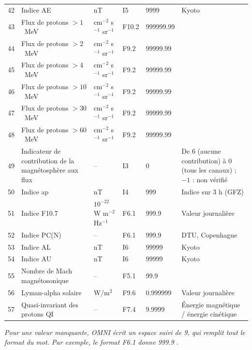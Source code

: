 \begin{longtable}{r p{5.0cm} p{2.0cm} l l p{3.3cm}}
42 & Indice AE & nT & I5 & 9999 & Kyoto \\
43 & Flux de protons $>1$~MeV & cm$^{-2}$ s$^{-1}$ sr$^{-1}$ & F10.2 & 999999.99 & \\
44 & Flux de protons $>2$~MeV & cm$^{-2}$ s$^{-1}$ sr$^{-1}$ & F9.2 & 99999.99 & \\
45 & Flux de protons $>4$~MeV & cm$^{-2}$ s$^{-1}$ sr$^{-1}$ & F9.2 & 99999.99 & \\
46 & Flux de protons $>10$~MeV & cm$^{-2}$ s$^{-1}$ sr$^{-1}$ & F9.2 & 99999.99 & \\
47 & Flux de protons $>30$~MeV & cm$^{-2}$ s$^{-1}$ sr$^{-1}$ & F9.2 & 99999.99 & \\
48 & Flux de protons $>60$~MeV & cm$^{-2}$ s$^{-1}$ sr$^{-1}$ & F9.2 & 99999.99 & \\
49 & Indicateur de contribution de la magnétosphère aux flux & -- & I3 & 0 & De 6 (aucune contribution) à 0 (tous les canaux) ; $-1$ : non vérifié \\
50 & Indice ap & nT & I4 & 999 & Indice sur 3 h (GFZ) \\
51 & Indice F10.7 & $10^{-22}$ W m$^{-2}$ Hz$^{-1}$ & F6.1 & 999.9 & Valeur journalière \\
52 & Indice PC(N) & -- & F6.1 & 999.9 & DTU, Copenhague \\
53 & Indice AL & nT & I6 & 99999 & Kyoto \\
54 & Indice AU & nT & I6 & 99999 & Kyoto \\
55 & Nombre de Mach magnétosonique & -- & F5.1 & 99.9 & \\
56 & Lyman-alpha solaire & W/m$^2$ & F9.6 & 0.999999 & Valeur journalière \\
57 & Quasi-invariant des protons QI & -- & F7.4 & 9.9999 & Énergie magnétique / énergie cinétique \\
\end{longtable}
\endgroup

\textit{Pour une valeur manquante, OMNI écrit un espace suivi de 9, qui remplit tout le format du mot. Par exemple, le format F6.1 donne 999.9 \cite{OMNI_LRO_doc}.}

